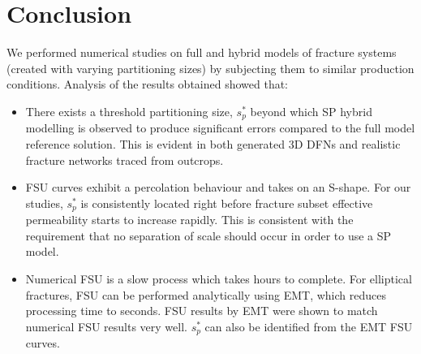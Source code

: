 \documentclass[a4paper]{article}
\begin{document}
\section{Conclusion}
We performed numerical studies on full and hybrid models of fracture systems (created with varying partitioning sizes) by subjecting them to similar production conditions. Analysis of the results obtained showed that:

\begin{itemize}
    \item There exists a threshold partitioning size, $s_p^*$ beyond which SP hybrid modelling is observed to produce significant errors compared to the full model reference solution. This is evident in both generated 3D DFNs and realistic fracture networks traced from outcrops.
    
    \item FSU curves exhibit a percolation behaviour and takes on an S-shape. For our studies, $s_p^*$ is consistently located right before fracture subset effective permeability starts to increase rapidly. This is consistent with the requirement that no separation of scale should occur in order to use a SP model.
    
    \item Numerical FSU is a slow process which takes hours to complete. For elliptical fractures, FSU can be performed analytically using EMT, which reduces processing time to seconds. FSU results by EMT were shown to match numerical FSU results very well. $s_p^*$ can also be identified from the EMT FSU curves. 
    
\end{itemize}
\end{document}
